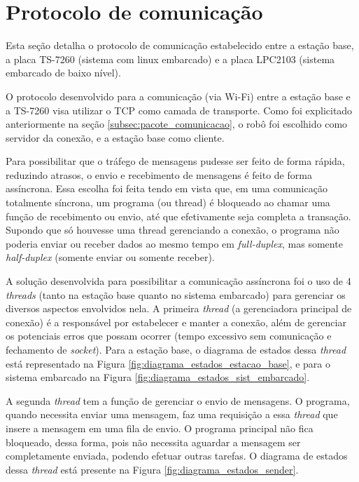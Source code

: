 \section{Protocolo de comunicação}

Esta seção detalha o protocolo de comunicação estabelecido entre a estação base, a placa TS-7260 (sistema com linux embarcado) e a placa LPC2103 (sistema embarcado de baixo nível).

O protocolo desenvolvido para a comunicação (via Wi-Fi) entre a estação base e a TS-7260 visa utilizar o TCP como camada de transporte. Como foi explicitado anteriormente na seção \ref{subsec:pacote_comunicacao}, o robô foi escolhido como servidor da conexão, e a estação base como cliente.

Para possibilitar que o tráfego de mensagens pudesse ser feito de forma rápida, reduzindo atrasos, o envio e recebimento de mensagens é feito de forma assíncrona.
Essa escolha foi feita tendo em vista que, em uma comunicação totalmente síncrona, um programa (ou thread) é bloqueado ao chamar uma função de recebimento ou envio, até que efetivamente seja completa a transação. Supondo que só houvesse uma thread gerenciando a conexão, o programa não poderia enviar ou receber dados ao mesmo tempo em \textit{full-duplex}, mas somente \textit{half-duplex} (somente enviar ou somente receber).

A solução desenvolvida para possibilitar a comunicação assíncrona foi o uso de 4 \textit{threads} (tanto na estação base quanto no sistema embarcado) para gerenciar os diversos aspectos envolvidos nela. A primeira \textit{thread} (a gerenciadora principal de conexão) é a responsável por estabelecer e manter a conexão, além de gerenciar os potenciais erros que possam ocorrer (tempo excessivo sem comunicação e fechamento de \textit{socket}). Para a estação base, o diagrama de estados dessa \textit{thread} está representado na Figura \ref{fig:diagrama_estados_estacao_base}, e para o sistema embarcado na Figura \ref{fig:diagrama_estados_sist_embarcado}.

A segunda \textit{thread} tem a função de gerenciar o envio de mensagens. O programa, quando necessita enviar uma mensagem, faz uma requisição a essa \textit{thread} que insere a mensagem em uma fila de envio. O programa principal não fica bloqueado, dessa forma, pois não necessita aguardar a mensagem ser completamente enviada, podendo efetuar outras tarefas. O diagrama de estados dessa \textit{thread} está presente na Figura \ref{fig:diagrama_estados_sender}.

